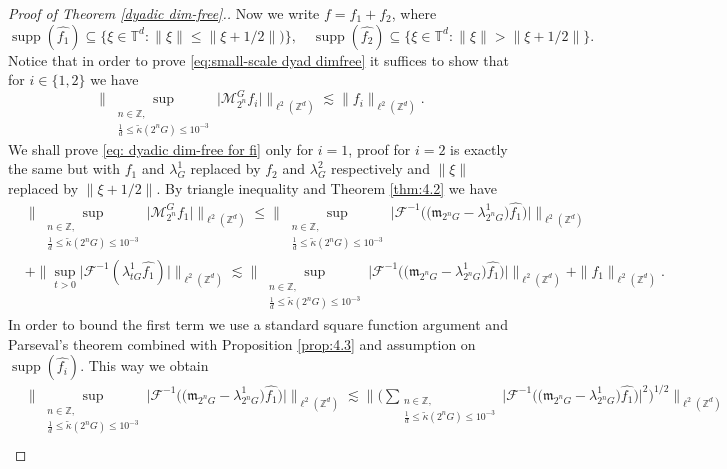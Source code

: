 \documentclass[a4paper,oneside, reqno]{amsart}
\numberwithin{equation}{section}
\theoremstyle{definition}%
\theoremstyle{definition}
\theoremstyle{definition}%
\theoremstyle{definition}
\newcommand{\Z}{\mathbb{Z}}
\newcommand{\T}{\mathbb{T}}
\DeclareMathOperator{\supp}{supp}
\begin{document}
\begin{proof}[Proof of Theorem \ref{dyadic dim-free}.]
Now we write $f=f_1+f_2$, where
\[
\supp(\widehat{f_1}) \subseteq \{ \xi \in \T^d : \|\xi\| \leq \|\xi +1/2\|) \},
\quad
\supp(\widehat{f_2}) \subseteq \{ \xi \in \T^d : \|\xi\| > \|\xi +1/2\| \}.
\]
Notice that in order to prove \eqref{eq:small-scale dyad dimfree} it suffices to show that for $i \in \{1,2\}$ we have 
\begin{equation} \label{eq: dyadic dim-free for fi}
    \bigg\| \sup_{\substack{n \in \Z, \\ \frac{1}{d} \le \widetilde{\kappa}(2^nG) \le 10^{-3}}} \big|\mathcal{M}_{2^n}^Gf_i \big| \bigg\|_{\ell^2(\Z^d) } \lesssim \|f_i \|_{\ell^2(\Z^d)}.
\end{equation}
We shall prove \eqref{eq: dyadic dim-free for fi} only for $i=1$, proof for $i=2$ is exactly the same but with $f_1$ and $\lambda_G^1$ replaced by $f_2$ and $\lambda_G^2$ respectively and $\|\xi\| $ replaced by $\| \xi+1/2\|$.
By triangle inequality and Theorem \ref{thm:4.2} we have
\begin{align*}
    &\bigg\| \sup_{\substack{n \in \Z, \\ \frac{1}{d} \le \widetilde{\kappa}(2^nG) \le 10^{-3}}} \big|\mathcal{M}_{2^n}^Gf_1 \big| \bigg\|_{\ell^2(\Z^d) } \le
    \bigg\| \sup_{\substack{n \in \Z, \\ \frac{1}{d} \le \widetilde{\kappa}(2^nG) \le 10^{-3}}} \Big|\mathcal{F}^{-1}\Big(\big(\mathfrak{m}_{2^nG}-\lambda_{2^nG}^1\big)\widehat{f_1} \Big) \Big| \bigg\|_{\ell^2(\Z^d) } \\
    &+ \bigg\| \sup_{t>0} \big|\mathcal{F}^{-1}(\lambda_{tG}^1 \widehat{f_1})\big|\bigg\|_{\ell^2(\Z^d)} \lesssim 
    \bigg\| \sup_{\substack{n \in \Z, \\ \frac{1}{d} \le \widetilde{\kappa}(2^nG) \le 10^{-3}}} \Big|\mathcal{F}^{-1}\Big(\big(\mathfrak{m}_{2^nG}-\lambda_{2^nG}^1\big)\widehat{f_1} \Big) \Big| \bigg\|_{\ell^2(\Z^d) } + \|f_1 \|_{\ell^2(\Z^d)}.
\end{align*}
In order to bound the first term we use a standard square function argument and Parseval's theorem combined with Proposition \ref{prop:4.3} and assumption on $\supp(\widehat{f_i})$. This way we obtain
\begin{align*}
     &\bigg\| \sup_{\substack{n \in \Z, \\ \frac{1}{d} \le \widetilde{\kappa}(2^nG) \le 10^{-3}}} \Big|\mathcal{F}^{-1}\Big(\big(\mathfrak{m}_{2^nG}-\lambda_{2^nG}^1\big)\widehat{f_1} \Big) \Big| \bigg\|_{\ell^2(\Z^d) } \lesssim 
     \Bigg\| \bigg( \sum_{\substack{n \in \Z, \\ \frac{1}{d} \le \widetilde{\kappa}(2^nG) \le 10^{-3}}} \Big|\mathcal{F}^{-1}\Big(\big(\mathfrak{m}_{2^nG}-\lambda_{2^nG}^1\big)\widehat{f_1} \Big) \Big|^2 \bigg)^{1/2} \Bigg\|_{\ell^2(\Z^d) } \\

\end{align*}
\end{proof}
\end{document}

